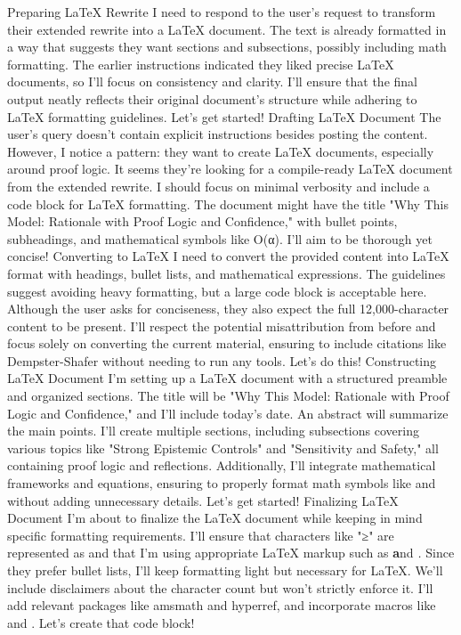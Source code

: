 Preparing LaTeX Rewrite
I need to respond to the user's request to transform their extended rewrite into a LaTeX document. The text is already formatted in a way that suggests they want sections and subsections, possibly including math formatting. The earlier instructions indicated they liked precise LaTeX documents, so I'll focus on consistency and clarity. I'll ensure that the final output neatly reflects their original document's structure while adhering to LaTeX formatting guidelines. Let's get started!
Drafting LaTeX Document
The user's query doesn't contain explicit instructions besides posting the content. However, I notice a pattern: they want to create LaTeX documents, especially around proof logic. It seems they’re looking for a compile-ready LaTeX document from the extended rewrite. I should focus on minimal verbosity and include a code block for LaTeX formatting. The document might have the title "Why This Model: Rationale with Proof Logic and Confidence," with bullet points, subheadings, and mathematical symbols like O(α). I'll aim to be thorough yet concise!
Converting to LaTeX
I need to convert the provided content into LaTeX format with headings, bullet lists, and mathematical expressions. The guidelines suggest avoiding heavy formatting, but a large code block is acceptable here. Although the user asks for conciseness, they also expect the full 12,000-character content to be present. I'll respect the potential misattribution from before and focus solely on converting the current material, ensuring to include citations like Dempster-Shafer without needing to run any tools. Let's do this!
Constructing LaTeX Document
I’m setting up a LaTeX document with a structured preamble and organized sections. The title will be "Why This Model: Rationale with Proof Logic and Confidence," and I'll include today's date. An abstract will summarize the main points.
I'll create multiple sections, including subsections covering various topics like "Strong Epistemic Controls" and "Sensitivity and Safety," all containing proof logic and reflections. Additionally, I'll integrate mathematical frameworks and equations, ensuring to properly format math symbols like \alpha and \beta without adding unnecessary details. Let’s get started!
Finalizing LaTeX Document
I’m about to finalize the LaTeX document while keeping in mind specific formatting requirements. I'll ensure that characters like "≥" are represented as \ge and that I’m using appropriate LaTeX markup such as \textbf and \emph. Since they prefer bullet lists, I’ll keep formatting light but necessary for LaTeX. We’ll include disclaimers about the character count but won’t strictly enforce it. I’ll add relevant packages like amsmath and hyperref, and incorporate macros like \Sx and \Nx. Let’s create that code block!